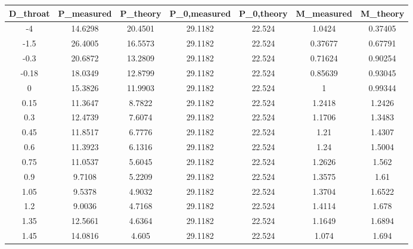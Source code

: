 \begin{tabular}{ccccccc}
\toprule
D_{throat} & P_{measured} & P_{theory} & P_{0,measured} & P_{0,theory} & M_{measured} & M_{theory} \\
\midrule
-4 & 14.6298 & 20.4501 & 29.1182 & 22.524 & 1.0424 & 0.37405 \\ 
-1.5 & 26.4005 & 16.5573 & 29.1182 & 22.524 & 0.37677 & 0.67791 \\ 
-0.3 & 20.6872 & 13.2809 & 29.1182 & 22.524 & 0.71624 & 0.90254 \\ 
-0.18 & 18.0349 & 12.8799 & 29.1182 & 22.524 & 0.85639 & 0.93045 \\ 
0 & 15.3826 & 11.9903 & 29.1182 & 22.524 & 1 & 0.99344 \\ 
0.15 & 11.3647 & 8.7822 & 29.1182 & 22.524 & 1.2418 & 1.2426 \\ 
0.3 & 12.4739 & 7.6074 & 29.1182 & 22.524 & 1.1706 & 1.3483 \\ 
0.45 & 11.8517 & 6.7776 & 29.1182 & 22.524 & 1.21 & 1.4307 \\ 
0.6 & 11.3923 & 6.1316 & 29.1182 & 22.524 & 1.24 & 1.5004 \\ 
0.75 & 11.0537 & 5.6045 & 29.1182 & 22.524 & 1.2626 & 1.562 \\ 
0.9 & 9.7108 & 5.2209 & 29.1182 & 22.524 & 1.3575 & 1.61 \\ 
1.05 & 9.5378 & 4.9032 & 29.1182 & 22.524 & 1.3704 & 1.6522 \\ 
1.2 & 9.0036 & 4.7168 & 29.1182 & 22.524 & 1.4114 & 1.678 \\ 
1.35 & 12.5661 & 4.6364 & 29.1182 & 22.524 & 1.1649 & 1.6894 \\ 
1.45 & 14.0816 & 4.605 & 29.1182 & 22.524 & 1.074 & 1.694 \\ 
\bottomrule
\end{tabular}
